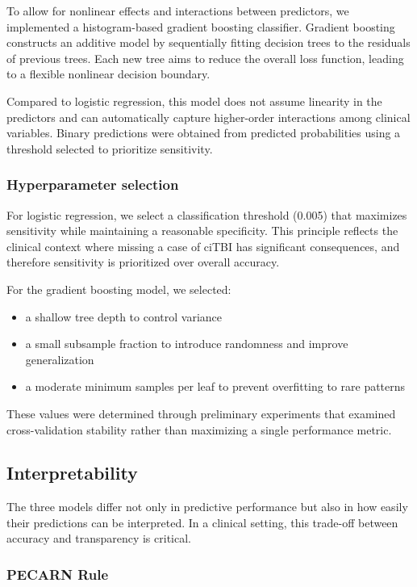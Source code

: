\documentclass[11pt,letterpaper]{article}
\begin{document}
To allow for nonlinear effects and interactions between predictors, we implemented a histogram-based gradient boosting classifier. Gradient boosting constructs an additive model by sequentially fitting decision trees to the residuals of previous trees. Each new tree aims to reduce the overall loss function, leading to a flexible nonlinear decision boundary.

Compared to logistic regression, this model does not assume linearity in the predictors and can automatically capture higher-order interactions among clinical variables. Binary predictions were obtained from predicted probabilities using a threshold selected to prioritize sensitivity.


\subsubsection{Hyperparameter selection}

For logistic regression, we select a classification threshold (0.005) that maximizes sensitivity while maintaining a reasonable specificity. This principle reflects the clinical context where missing a case of ciTBI has significant consequences, and therefore sensitivity is prioritized over overall accuracy.

For the gradient boosting model, we selected:

\begin{itemize}
    \item a shallow tree depth to control variance
    \item a small subsample fraction to introduce randomness and improve generalization
    \item a moderate minimum samples per leaf to prevent overfitting to rare patterns
\end{itemize}

These values were determined through preliminary experiments that examined cross-validation stability rather than maximizing a single performance metric.


\subsection{Interpretability}

The three models differ not only in predictive performance but also in how easily their predictions can be interpreted. In a clinical setting, this trade-off between accuracy and transparency is critical.

\subsubsection{PECARN Rule}
\end{document}
